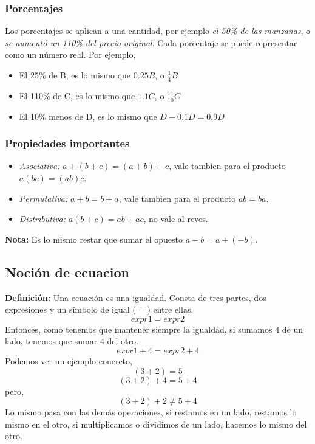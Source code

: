\documentclass{article}
\begin{document}
\subsubsection*{Porcentajes}
\begin{normalsize}
Los porcentajes se aplican a una cantidad, por ejemplo \textit{el 50\% de las manzanas}, o \textit{se aumentó un 110\% del precio original}.
Cada porcentaje se puede representar como un número real.
Por ejemplo,
\begin{itemize}
	\item El 25\% de B, es lo mismo que $0.25B$, o $\frac{1}{4}B$
	\item El 110\% de C, es lo mismo que $1.1C$, o $\frac{11}{10}C$
	\item El 10\% menos de D, es lo mismo que $D-0.1D=0.9D$
\end{itemize}
\end{normalsize}

\subsubsection*{Propiedades importantes}
\begin{normalsize}
\begin{itemize}
	\item \textit{Asociativa:} $a+(b+c)=(a+b)+c$, vale tambien para el producto $a(bc)=(ab)c$.
	\item \textit{Permutativa:} $a+b=b+a$, vale tambien para el producto $ab=ba$.
	\item \textit{Distributiva:} $a(b+c)=ab+ac$, no vale al reves.
\end{itemize}

\textbf{Nota:} Es lo mismo restar que sumar el opuesto $a-b=a+(-b)$.
\end{normalsize}

\subsection{Noción de ecuacion}
\begin{normalsize}
\textbf{Definición:} Una ecuación es una igualdad. Consta de tres partes, dos expresiones y un símbolo de igual ($=$) entre ellas.
\[expr1=expr2\]
Entonces, como tenemos que mantener siempre la igualdad, si sumamos $4$ de un lado, tenemos que sumar $4$ del otro.
\[expr1+4=expr2+4\]
Podemos ver un ejemplo concreto,
\[(3+2)=5\]
\[(3+2)+4=5+4\]
pero,
\[(3+2)+2\neq5+4\]
Lo mismo pasa con las demás operaciones, si restamos en un lado, restamos lo mismo en el otro, si multiplicamos o dividimos de un lado, hacemos lo mismo del otro.
\end{normalsize}
\end{document}
